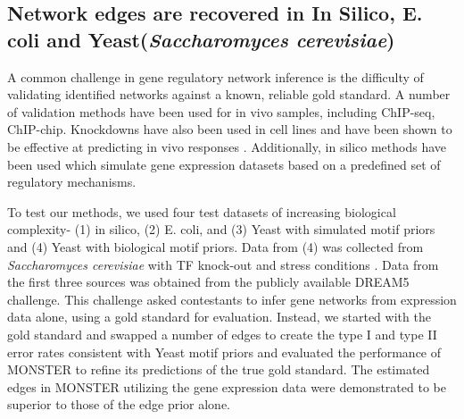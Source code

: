\documentclass[9pt,twocolumn,twoside]{pnas-new}
\begin{document}
\subsection*{Network edges are recovered in In Silico, E. coli and Yeast(\emph{Saccharomyces cerevisiae})}

A common challenge in gene regulatory network inference is the difficulty
of validating identified networks against a known, reliable gold standard.
A number of validation methods have been used for in vivo samples,
including ChIP-seq, ChIP-chip. Knockdowns have also been used in cell
lines and have been shown to be effective at predicting in vivo responses
\cite{olsen2014inference}. Additionally, in silico methods have been
used which simulate gene expression datasets based on a predefined
set of regulatory mechanisms.

To test our methods, we used four test datasets of increasing biological
complexity- (1) in silico, (2) E. coli, and (3) Yeast with simulated
motif priors and (4) Yeast with biological motif priors. Data from
(4) was collected from \emph{Saccharomyces cerevisiae} with TF knock-out
and stress conditions \cite{harbison2004transcriptional}. Data from
the first three sources was obtained from the publicly available DREAM5
challenge\cite{marbach2012wisdom}. This challenge asked contestants
to infer gene networks from expression data alone, using a gold standard
for evaluation. Instead, we started with the gold standard and swapped
a number of edges to create the type I and type II error rates consistent
with Yeast motif priors and evaluated the performance of MONSTER to
refine its predictions of the true gold standard. The estimated edges
in MONSTER utilizing the gene expression data were demonstrated to
be superior to those of the edge prior alone.
\end{document}
